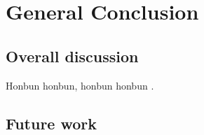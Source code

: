 \chapter{General Conclusion}

\section{Overall discussion}

Honbun honbun, honbun honbun \citep{zhao_crop_2019}. 


\section{Future work}
